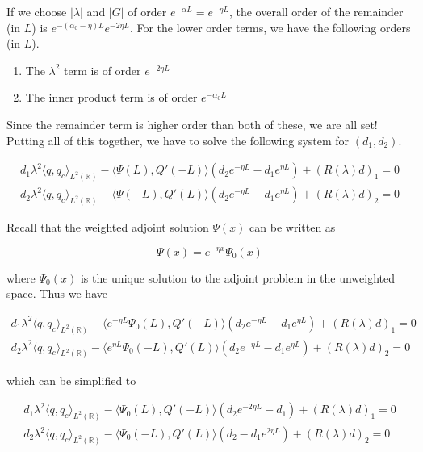\documentclass[12pt]{article}
\def\R{{\mathbb R}}
\begin{document}
If we choose $|\lambda|$ and $|G|$ of order $e^{-\alpha L} = e^{-\eta L}$, the overall order of the remainder (in $L$) is $e^{-(\alpha_0 - \eta) L} e^{-2 \eta L}$. For the lower order terms, we have the following orders (in $L$).

\begin{enumerate}
	\item The $\lambda^2$ term is of order $e^{-2 \eta L}$
	\item The inner product term is of order $e^{-\alpha_0 L}$
\end{enumerate}

Since the remainder term is higher order than both of these, we are all set!\\

Putting all of this together, we have to solve the following system for $(d_1, d_2)$.

\begin{align*}
d_1 \lambda^2 \langle q, q_c \rangle_{L^2(\R)} - \langle \Psi(L), Q'(-L) \rangle (d_2 e^{-\eta L} - d_1 e^{\eta L}) + (R(\lambda)d)_1 = 0\\
d_2 \lambda^2 \langle q, q_c \rangle_{L^2(\R)} - \langle \Psi(-L), Q'(L) \rangle (d_2 e^{-\eta L} - d_1 e^{\eta L})  + (R(\lambda)d)_2 = 0
\end{align*}

Recall that the weighted adjoint solution $\Psi(x)$ can be written as

\[
\Psi(x) = e^{-\eta x} \Psi_0(x)
\]

where $\Psi_0(x)$ is the unique solution to the adjoint problem in the unweighted space. Thus we have

\begin{align*}
d_1 \lambda^2 \langle q, q_c \rangle_{L^2(\R)} - \langle e^{-\eta L} \Psi_0(L), Q'(-L) \rangle (d_2 e^{-\eta L} - d_1 e^{\eta L}) + (R(\lambda)d)_1 = 0\\
d_2 \lambda^2 \langle q, q_c \rangle_{L^2(\R)} - \langle e^{\eta L} \Psi_0(-L), Q'(L) \rangle (d_2 e^{-\eta L} - d_1 e^{\eta L})  + (R(\lambda)d)_2 = 0
\end{align*}

which can be simplified to

\begin{align*}
d_1 \lambda^2 \langle q, q_c \rangle_{L^2(\R)} - \langle \Psi_0(L), Q'(-L) \rangle (d_2 e^{-2 \eta L} - d_1) + (R(\lambda)d)_1 = 0\\
d_2 \lambda^2 \langle q, q_c \rangle_{L^2(\R)} - \langle \Psi_0(-L), Q'(L) \rangle (d_2 - d_1 e^{2 \eta L})  + (R(\lambda)d)_2 = 0
\end{align*}
\end{document}

